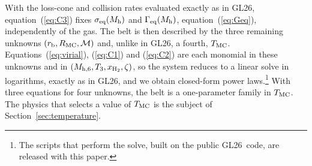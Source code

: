\documentclass[twocolumn,pdftex]{aastex701}
\newcommand{\Mh}{M_{\rm h}}
\newcommand{\mhsix}{M_{\rm h,6}}
\newcommand{\Tthree}{T_{3}}
\newcommand{\xhh}{x_{\rm H_2}}
\newcommand{\Geq}{\Gamma_{\rm eq}}
\newcommand{\GL}{GL26}
\begin{document}
With the loss-cone and collision rates evaluated exactly as in \GL, equation~(\ref{eq:C3}) fixes $\sigma_{\rm eq}(\Mh)$ and $\Geq(\Mh)$, equation~(\ref{eq:Geq}), independently of the gas. The belt is then described by the three remaining unknowns $(r_{\rm b},R_{\rm MC},\mathcal{M})$ and, unlike in \GL, a fourth, $T_{\rm MC}$. Equations~(\ref{eq:virial}), (\ref{eq:C1}) and (\ref{eq:C2}) are each monomial in these unknowns and in $(\mhsix,\Tthree,\xhh,\zeta)$, so the system reduces to a linear solve in logarithms, exactly as in \GL, and we obtain closed-form power laws.\footnote{The scripts that perform the solve, built on the public \GL\ code, are released with this paper.} With three equations for four unknowns, the belt is a one-parameter family in $T_{\rm MC}$. The physics that selects a value of $T_{\rm MC}$ is the subject of Section~\ref{sec:temperature}.
\end{document}
